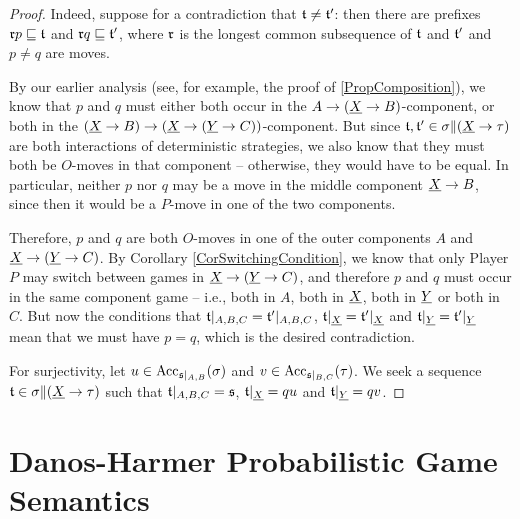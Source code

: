 \documentclass{report}[11pt]
\begin{document}
\begin{proof}
  Indeed, suppose for a contradiction that $\mathfrak t\ne\mathfrak t'$: then there are prefixes $\mathfrak r p\sqsubseteq \mathfrak t$ and $\mathfrak r q \sqsubseteq \mathfrak t'$, where $\mathfrak r$ is the longest common subsequence of $\mathfrak t$ and $\mathfrak t'$ and $p\ne q$ are moves.

  By our earlier analysis (see, for example, the proof of \ref{PropComposition}), we know that $p$ and $q$ must either both occur in the $A \to ({\underline{X}} \to B)$-component, or both in the $({\underline{X}} \to B) \to ({\underline{X}} \to ({\underline{Y}} \to C))$-component.
  But since $\mathfrak t,\mathfrak t'\in\sigma\|({\underline{X}} \to \tau)$ are both interactions of deterministic strategies, we also know that they must both be $O$-moves in that component -- otherwise, they would have to be equal.
  In particular, neither $p$ nor $q$ may be a move in the middle component ${\underline{X}} \to B$, since then it would be a $P$-move in one of the two components.

  Therefore, $p$ and $q$ are both $O$-moves in one of the outer components $A$ and ${\underline{X}} \to ({\underline{Y}} \to C)$.  
  By Corollary \ref{CorSwitchingCondition}, we know that only Player $P$ may switch between games in ${\underline{X}} \to ({\underline{Y}} \to C)$, and therefore $p$ and $q$ must occur in the same component game -- i.e., both in $A$, both in ${\underline{X}}$, both in ${\underline{Y}}$ or both in $C$.  
  But now the conditions that $\mathfrak t\vert_{A,B,C}=\mathfrak t'\vert_{A,B,C}$, $\mathfrak t\vert_{{\underline{X}}}=\mathfrak t'\vert_{{\underline{X}}}$ and $\mathfrak t\vert_{{\underline{Y}}}=\mathfrak t'\vert_{{\underline{Y}}}$ mean that we must have $p=q$, which is the desired contradiction.

  For surjectivity, let $u\in\operatorname{Acc}_{\mathfrak s\vert_{A,B}}(\sigma)$ and $v\in\operatorname{Acc}_{\mathfrak s\vert_{B,C}}(\tau)$.  
  We seek a sequence $\mathfrak t\in\sigma\|({\underline{X}} \to \tau)$ such that $\mathfrak t\vert_{A,B,C}=\mathfrak s$, $\mathfrak t\vert_{{\underline{X}}}=qu$ and $\mathfrak t\vert_{{\underline{Y}}}=qv$.
\end{proof}

\section{Danos-Harmer Probabilistic Game Semantics}



\end{document}
